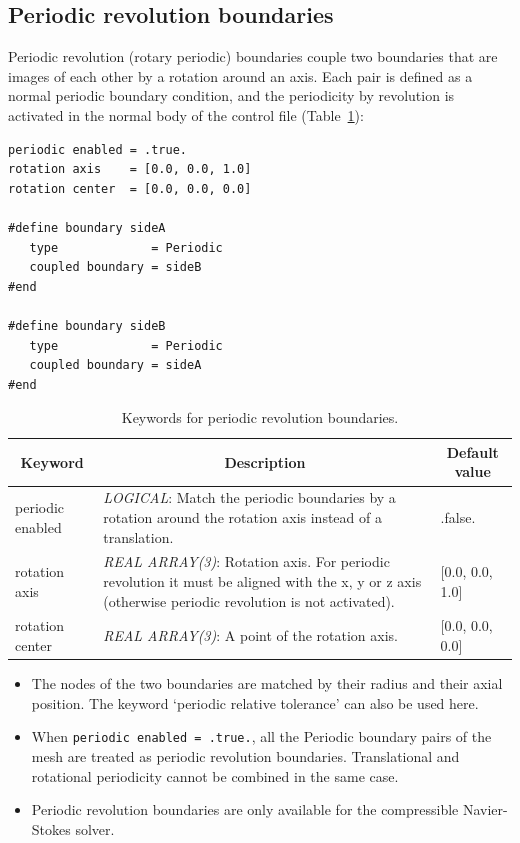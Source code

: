 \documentclass[a4paper,10pt]{report}
\begin{document}
\subsection{Periodic revolution boundaries}\label{sec:PeriodicRevolution}

Periodic revolution (rotary periodic) boundaries couple two boundaries that are images of each other by a rotation around an axis. Each pair is defined as a normal periodic boundary condition, and the periodicity by revolution is activated in the normal body of the control file (Table~\ref{tab:PeriodicRevolution}):

\begin{lstlisting}
periodic enabled = .true.
rotation axis    = [0.0, 0.0, 1.0]
rotation center  = [0.0, 0.0, 0.0]

#define boundary sideA
   type             = Periodic
   coupled boundary = sideB
#end

#define boundary sideB
   type             = Periodic
   coupled boundary = sideA
#end
\end{lstlisting}

\begin{table}[h]
\caption{Keywords for periodic revolution boundaries.}\label{tab:PeriodicRevolution}
\begin{tabular}{|p{4cm}|p{10cm}|p{2.2cm}|}
\hline
\multicolumn{1}{|c|}{\textbf{Keyword}} & \multicolumn{1}{c|}{\textbf{Description}} & \multicolumn{1}{c|}{\textbf{Default value}} \\ \hline
periodic enabled & \textit{LOGICAL}: Match the periodic boundaries by a rotation around the rotation axis instead of a translation. & .false. \\ \hline
rotation axis & \textit{REAL ARRAY(3)}: Rotation axis. For periodic revolution it must be aligned with the x, y or z axis (otherwise periodic revolution is not activated). & [0.0, 0.0, 1.0] \\ \hline
rotation center & \textit{REAL ARRAY(3)}: A point of the rotation axis. & [0.0, 0.0, 0.0] \\ \hline
\end{tabular}
\end{table}

\begin{itemize}
\item The nodes of the two boundaries are matched by their radius and their axial position. The keyword `periodic relative tolerance' can also be used here.
\item When \texttt{periodic enabled = .true.}, all the Periodic boundary pairs of the mesh are treated as periodic revolution boundaries. Translational and rotational periodicity cannot be combined in the same case.
\item Periodic revolution boundaries are only available for the compressible Navier-Stokes solver.
\end{itemize}
\end{document}
